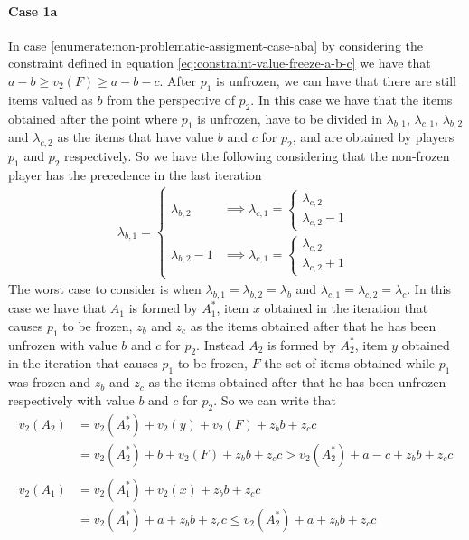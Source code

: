 \paragraph{Case 1a}
In case \ref{enumerate:non-problematic-assigment-case-aba} by considering the constraint defined in equation \ref{eq:constraint-value-freeze-a-b-c} we have that $a-b\ge v_2(F)\ge a-b-c$. After $p_1$ is unfrozen, we can have that there are still items valued as $b$ from the perspective of $p_2$. In this case we have that the items obtained after the point where $p_1$ is unfrozen, have to be divided in $\lambda_{b, 1}$, $\lambda_{c, 1}$, $\lambda_{b, 2}$ and  $\lambda_{c, 2}$ as the items that have value $b$ and $c$ for $p_2$, and are obtained by players $p_1$ and $p_2$ respectively.
 So we have the following considering that the non-frozen player has the precedence in the last iteration
\begin{align*}
\lambda_{b,1} = \begin{cases} 
\lambda_{b,2} &\implies \lambda_{c,1} = \begin{cases} 
\lambda_{c,2}\\
\lambda_{c,2} -1
\end{cases}   \\
\lambda_{b,2} -1 &\implies \lambda_{c,1} = \begin{cases} 
\lambda_{c,2}\\
\lambda_{c,2} +1
\end{cases}   
\end{cases}
\end{align*}
The worst case to consider is when $\lambda_{b,1} = \lambda_{b,2} = \lambda_b$ and $\lambda_{c,1} = \lambda_{c,2} = \lambda_c$. In this case we have that $A_1$ is formed by $A_1^*$, item $x$ obtained in the iteration that causes $p_1$ to be frozen, $z_b$ and $z_c$ as the items obtained after that he has been unfrozen with value $b$ and $c$ for $p_2$. Instead $A_2$ is formed by $A_2^*$, item $y$ obtained in the iteration that causes $p_1$ to be frozen, $F$ the set of items obtained while $p_1$ was frozen and $z_b$ and $z_c$ as the items obtained after that he has been unfrozen respectively with value $b$ and $c$ for $p_2$. So we can write that 
\begin{align*}
    v_2(A_2) &= v_2(A_2^*) + v_2(y) + v_2(F) + z_b b + z_cc\\
    &= v_2(A_2^*) + b + v_2(F) + z_bb +  z_cc > v_2(A_2^*) + a-c + z_b b + z_cc\\\\
    v_2(A_1) &= v_2(A_1^*) + v_2(x) + z_bb + z_cc \\
    &=v_2(A_1^*) + a + z_bb + z_cc\le v_2(A_2^*) + a + z_bb + z_cc
\end{align*}
